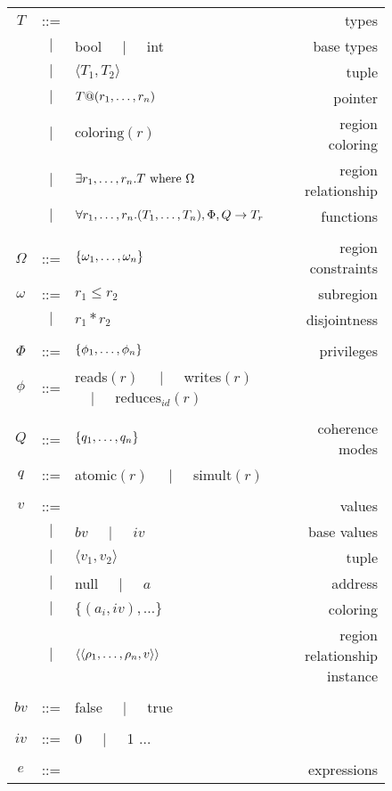 \begin{figure*}
\centering
{\small
\begin{tabular}{cclr}

$T$ & ::= &  & types \\
  &$\mid$& bool $\;\;\;\mid\;\;\;$ int & base types \\
  &$\mid$& $\langle T_1, T_2 \rangle$ & tuple \\
  &$\mid$& $T@({r}_1,\ldots,{r}_n)$ & pointer \\
  &$\mid$& $\text{coloring}(r)$ & region coloring \\
  &$\mid$& $\exists {r}_1,\ldots,{r}_n. T\text{ where }\Omega$ & region relationship \\
  &$\mid$& $\forall {r}_1,\ldots,{r}_n. ({T}_1,\ldots,{T}_n), \Phi, Q \rightarrow T_r$ & functions \\
\\
$\Omega$ & ::= & $\{ {\omega}_1,\ldots,{\omega}_n \}$ & region constraints \\
$\omega$ & ::= & $r_1 \leq r_2$ & subregion \\
  &$\mid$& $r_1 * r_2$ & disjointness \\
\\
$\Phi$ & ::= & $\{ {\phi}_1,\ldots,{\phi}_n \}$ & privileges \\
$\phi$ & ::= & reads$(r)$ $\;\;\;\mid\;\;\;$ writes$(r)$ $\;\;\;\mid\;\;\;$ $\text{reduces}_{id}(r)$ & \\
\\
$Q$ & ::= & $\{ {q}_1,\ldots,{q}_n \}$ & coherence modes \\
$q$ & ::= & atomic$(r)$ $\;\;\;\mid\;\;\;$ simult$(r)$ & \\
\\
$v$ & ::= & & values \\
  &$\mid$& $bv$ $\;\;\;\mid\;\;\;$ $iv$ & base values \\
  &$\mid$& $\langle v_1, v_2 \rangle$ & tuple \\
  &$\mid$& null $\;\;\;\mid\;\;\;$ $a$ & address \\
  &$\mid$& $\{ (a_i, iv), \ldots \}$ & coloring \\
  &$\mid$& $\langle \langle {\rho}_1,\ldots,{\rho}_n, v\rangle \rangle$ & region relationship instance \\
\\
$bv$ & ::= & false $\;\;\;\mid\;\;\;$ true \\
\\
$iv$ & ::= & 0 $\;\;\;\mid\;\;\;$ 1 $\ldots$ \\
\\
$e$ & ::= & & expressions \\

\end{tabular}}
\end{figure*}
